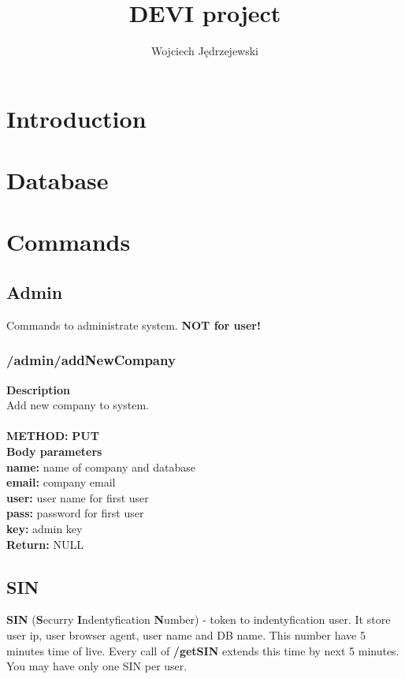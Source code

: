 \documentclass[a4paper, 12pt]{report}
\begin{document}
\title{\Large{\textbf{DEVI project}}}
\author{Wojciech Jędrzejewski}

\maketitle

\chapter{Introduction}

\chapter{Database}

\chapter{Commands}
\section{Admin}
Commands to administrate system. \textbf{NOT for user!}

\subsection{/admin/addNewCompany}


\textbf{\color{redText} Description} \\
Add new company to system. \\ \\
\textbf{\color{redText} METHOD: } \textbf{PUT} \\
\textbf{\color{redText} Body parameters} \\
\textbf{name: } name of company and database \\
\textbf{email: } company email \\
\textbf{user: } user name for first user \\
\textbf{pass: } password for first user \\
\textbf{key: } admin key \\
\textbf{\color{redText} Return: } NULL

\section{SIN}
\textbf{SIN} (\textbf{S}ecurry \textbf{I}ndentyfication \textbf{N}umber) - token to indentyfication user. It store user ip, user browser agent, user name and DB name.
This number have 5 minutes time of live. Every call of \textbf{/getSIN} extends this time by next 5 minutes.
You may have only one SIN per user.
\end{document}
